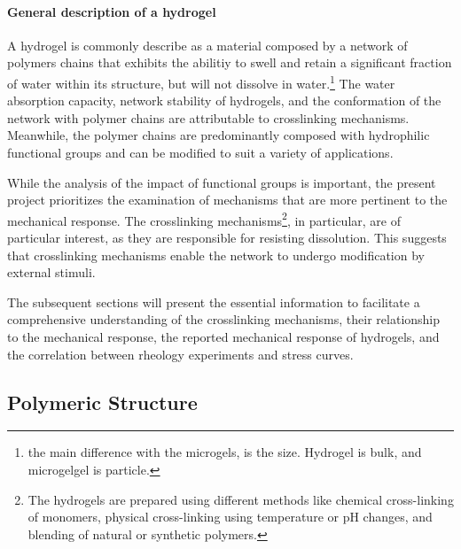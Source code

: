 \paragraph{General description of a hydrogel}
A hydrogel is commonly describe as a material composed by a network of polymers chains that exhibits the abilitiy to swell and retain a significant fraction of water within its structure, but will not dissolve in water\citep{ahmedHydrogelPreparationCharacterization2015a,ahmedHydrogelsMicrogelsDriving2025,priyaComprehensiveReviewHydrogel2024,bustamantetorresHydrogelsClassificationAccording2021}.\footnote{the main difference with the microgels, is the size. Hydrogel is bulk, and microgelgel is particle.}
The water absorption capacity, network stability of hydrogels, and the conformation of the network with polymer chains are attributable to crosslinking mechanisms\citep{priyaComprehensiveReviewHydrogel2024,ahmedHydrogelPreparationCharacterization2015a}.
Meanwhile, the polymer chains are predominantly composed with hydrophilic functional groups and can be modified to suit a variety of applications\citep{ahmedHydrogelPreparationCharacterization2015a,priyaComprehensiveReviewHydrogel2024,bustamantetorresHydrogelsClassificationAccording2021}.


While the analysis of the impact of functional groups is important, the present project prioritizes the examination of mechanisms that are more pertinent to the mechanical response. 
The crosslinking mechanisms\footnote{The hydrogels are prepared using different methods like chemical cross-linking of monomers, physical cross-linking using temperature or pH changes, and blending of natural or synthetic polymers.}, in particular, are of particular interest, as they are responsible for resisting dissolution. 
This suggests that crosslinking mechanisms enable the network to undergo modification by external stimuli.

The subsequent sections will present the essential information to facilitate a comprehensive understanding of the crosslinking mechanisms, their relationship to the mechanical response, the reported mechanical response of hydrogels, and the correlation between rheology experiments and stress curves.


\subsection{Polymeric Structure}

